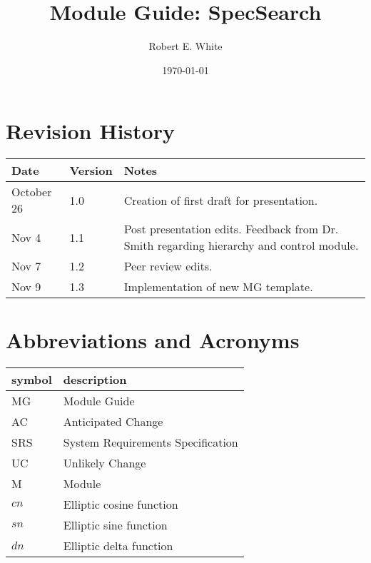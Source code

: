 \documentclass[12pt, titlepage]{article}
\begin{document}
	
	\title{Module Guide: SpecSearch} 
	\author{Robert E. White}
	\date{\today}
	
	\maketitle
	\section{Revision History}
	
	\begin{tabularx}{\textwidth}{p{3cm}p{2cm}X}
		\toprule {\bf Date} & {\bf Version} & {\bf Notes}\\
		\midrule
		October 26 & 1.0 & Creation of first draft for presentation.\\ 
		Nov 4 & 1.1 & Post presentation edits. Feedback from Dr. Smith 
		regarding 
		hierarchy and control module.\\
		Nov 7 & 1.2 & Peer review edits. \\ 
		Nov 9 & 1.3 & Implementation of new MG template. \\ 
		\bottomrule
	\end{tabularx}
	
	\newpage
	
	\tableofcontents
	
	\listoftables
	
	\listoffigures
	\section*{Abbreviations and Acronyms}
	
	\renewcommand{\arraystretch}{1.2}
	\begin{tabular}{l l} 
		\toprule		
		\textbf{symbol} & \textbf{description}\\
		\midrule 
		MG & Module Guide\\
		AC & Anticipated Change\\ 
		SRS & System Requirements Specification\\ 
		UC & Unlikely Change\\
		M & Module\\ 
		$cn$ & Elliptic cosine function\\ 
		$sn$ & Elliptic sine function\\ 
		$dn$ & Elliptic delta function \\ 
		\bottomrule
	\end{tabular}\\
	
\end{document}

